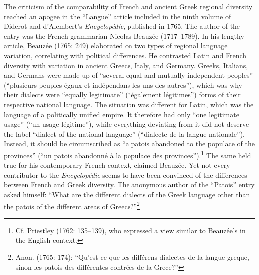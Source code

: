 \begin{styleStandard}
The criticism of the comparability of French and ancient Greek regional diversity reached an apogee in the “Langue” article included in the ninth volume of Diderot and d’Alembert’s \textit{Encyclopédie}, published in 1765. The author of the entry was the French grammarian Nicolas Beauzée (1717–1789). In his lengthy article, Beauzée (1765: 249) elaborated on two types of regional language variation, correlating with political differences. He contrasted Latin and French diversity with variation in ancient Greece, Italy, and Germany. Greeks, Italians, and Germans were made up of “several equal and mutually independent peoples” (“plusieurs peuples égaux et indépendans les uns des autres”), which was why their dialects were “equally legitimate” (“également légitimes”) forms of their respective national language. The situation was different for Latin, which was the language of a politically unified empire. It therefore had only “one legitimate usage” (“un usage légitime”), while everything deviating from it did not deserve the label “dialect of the national language” (“dialecte de la langue nationale”). Instead, it should be circumscribed as “a patois abandoned to the populace of the provinces” (“un patois abandonné à la populace des provinces”).\footnote{ Cf. Priestley (1762: 135–139), who expressed a view similar to Beauzée’s in the English context.} The same held true for his contemporary French context, claimed Beauzée. Yet not every contributor to the \textit{Encyclopédie} seems to have been convinced of the differences between French and Greek diversity. The anonymous author of the “Patois” entry asked himself: “What are the different dialects of the Greek language other than the patois of the different areas of Greece?”\footnote{ Anon. (1765: 174): “Qu’est-ce que les différens dialectes de la langue greque, sinon les patois des différentes contrées de la Grece?”}
\end{styleStandard}

